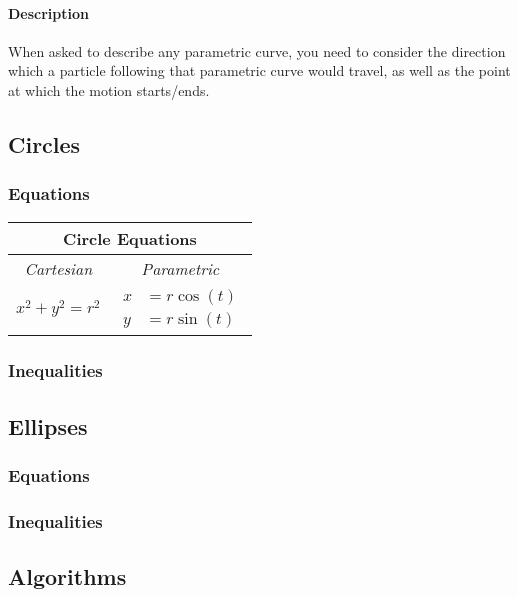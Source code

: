 \documentclass[a4paper]{article}
\begin{document}
				\paragraph{Description}
					When asked to describe any parametric curve, you need to consider the direction which a particle following that parametric curve would travel, as well as the point at which the motion starts/ends.
		\subsection{Circles}
			\subsubsection{Equations}
				\bgroup
				\def\arraystretch{2}
				\begin{table}[H]
					\centering
					\begin{tabular}{|c|c|}
						\hline
						\multicolumn{2}{|c|}{\textbf{Circle Equations}} \\
						\hline
						\textit{Cartesian} & \textit{Parametric} \\
						\hline
						$x^2+y^2=r^2$ & {$\!\begin{aligned}x&=r\cos(t)\\y&=r\sin(t)\end{aligned}$} \\
						\hline
					\end{tabular}
				\end{table}
				\egroup
			\subsubsection{Inequalities}
		\subsection{Ellipses}
			\subsubsection{Equations}
			\subsubsection{Inequalities}
		\subsection{Algorithms}
\end{document}
